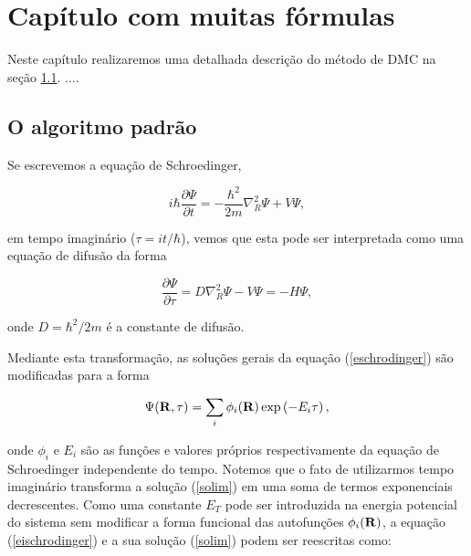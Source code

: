 \documentclass[12pt,twoside,a4paper]{report}
\begin{document}



%






\label{c1}




\chapter{Capítulo com muitas fórmulas} \label{ometodo}

Neste capítulo realizaremos uma detalhada descrição do método de DMC na seção \ref{alg_padr}. ....

\section{O algoritmo padrão}
\label{alg_padr}

Se escrevemos a equação de Schroedinger,

\begin{equation} \label{eschrodinger}
i\hbar \frac{\partial \Psi}{\partial t}= -\frac{\hbar^2}{2m}
\nabla_R^2 \Psi + V\Psi,
\end{equation}

\noindent em tempo imaginário ($\tau=it/\hbar$), vemos que esta
pode ser interpretada como uma equação de difusão da forma

\begin{equation} \label{eischrodinger}
\frac{\partial \Psi}{\partial \tau}= D \nabla_R^2 \Psi - V
\Psi = - H \Psi,
\end{equation}

\noindent onde $D=\hbar^2/2m$ é a constante de difusão.

Mediante esta transformação, as soluções gerais da equação
(\ref{eschrodinger}) são
modificadas para a forma

\begin{equation} \label{solim}
\Psi({\bf R},\tau) = \sum_i \phi_i ({\bf R}) \exp  \left( - E_i
\tau \right),
\end{equation}

\noindent onde $\phi_i$ e $E_i$ são as funções e valores próprios
respectivamente da equação de Schroedinger independente do tempo.
Notemos que o fato de utilizarmos tempo imaginário transforma a
solução (\ref{solim}) em uma soma de termos exponenciais decrescentes. Como uma
constante
$E_T$ pode ser
introduzida na energia potencial do sistema sem modificar a forma
funcional das
autofunções $\phi_i({\bf R})$, a equação (\ref{eischrodinger}) e a
sua solução
(\ref{solim}) podem ser reescritas como:
\end{document}
